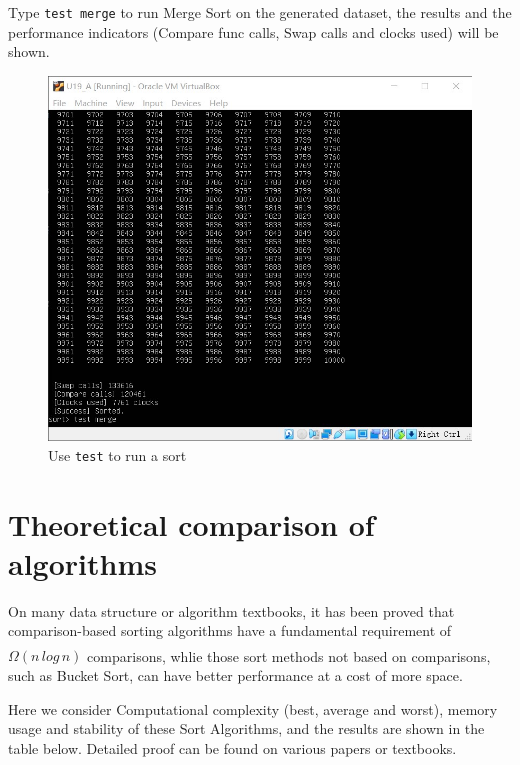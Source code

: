 \documentclass[cn,black,12pt,normal]{elegantnote}
\newcommand{\uct}[1]{\textsuperscript{\textsuperscript{\cite{#1}}}}
\begin{document}
Type \lstinline{test merge} to run Merge Sort on the generated dataset, the results and the performance indicators (Compare func calls, Swap calls and clocks used) will be shown.

\begin{figure}[H]
    \centering
    \includegraphics[width=0.7\linewidth]{image/sort_04.jpg}
    \caption{Use \lstinline{test} to run a sort}
\end{figure}

\section{Theoretical comparison of algorithms}

On many data structure or algorithm textbooks, it has been proved that comparison-based sorting algorithms have a fundamental requirement of $\Omega(n \, log \, n) $ comparisons,\uct{cormen2009introduction} whlie those sort methods not based on comparisons, such as Bucket Sort, can have better performance at a cost of more space.

Here we consider Computational complexity (best, average and worst), memory usage and stability of these Sort Algorithms, and the results are shown in the table below. Detailed proof can be found on various papers or textbooks.
\end{document}
